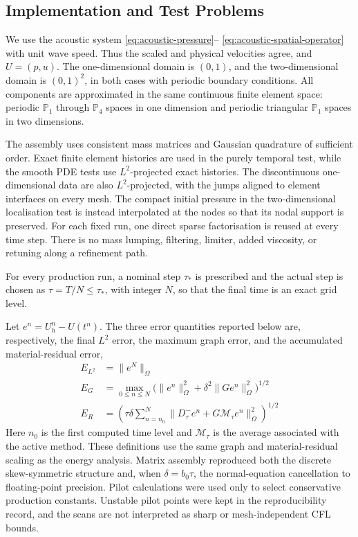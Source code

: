 \documentclass[11pt]{article}
\begin{document}

\subsection{Implementation and Test Problems}
\label{subsec:numerical-implementation}
We use the acoustic system \eqref{eq:acoustic-pressure}--
\eqref{eq:acoustic-spatial-operator} with unit wave speed. Thus the scaled
and physical velocities agree, and \(U=(p,u)\). The one-dimensional domain is
\((0,1)\), and the two-dimensional domain is \((0,1)^2\), in both cases with
periodic boundary conditions. All components are approximated in the same
continuous finite element space: periodic \(\mathbb P_1\) through \(\mathbb P_4\) spaces in one
dimension and periodic triangular \(\mathbb P_1\) spaces in two dimensions.

The assembly uses consistent mass matrices and Gaussian quadrature of
sufficient order. Exact finite element histories are used in the purely
temporal test, while the smooth PDE tests use \(L^2\)-projected exact
histories. The discontinuous one-dimensional data are also \(L^2\)-projected,
with the jumps aligned to element interfaces on every mesh. The compact
initial pressure in the two-dimensional localisation test is instead
interpolated at the nodes so that its nodal support is preserved. For each fixed run, one
direct sparse factorisation is reused at every time step. There is no mass
lumping, filtering, limiter, added viscosity, or retuning along a refinement
path.

For every production run, a nominal step \(\tau_*\) is prescribed and the
actual step is chosen as \(\tau=T/N\leq\tau_*\), with integer \(N\), so that
the final time is an exact grid level.

Let \(e^n=U_h^n-U(t^n)\). The three error quantities reported below are,
respectively, the final \(L^2\) error, the maximum graph error, and the
accumulated material-residual error,
\begin{align}
E_{L^2}&=\|e^N\|_{\Omega} \label{eq:numerical-final-l2-error}\\
E_{G}&=\max_{0\le n\le N}
\bigl(\|e^n\|_{\Omega}^2+\delta^2\|Ge^n\|_{\Omega}^2\bigr)^{1/2}
\label{eq:numerical-maximum-graph-error}\\
E_{R}&=\left(\tau\delta\sum_{n=n_0}^{N}
\|D_{\tau}^{-}e^n+G\mathcal M_{\tau}e^n\|_{\Omega}^2\right)^{1/2}
\label{eq:numerical-material-residual-error}
\end{align}
Here \(n_0\) is the first computed time level and \(\mathcal M_{\tau}\) is the
average associated with the active method. These definitions use the same
graph and material-residual scaling as the energy analysis. Matrix assembly
reproduced both the discrete skew-symmetric structure and, when
\(\delta=b_0\tau\), the normal-equation cancellation to
floating-point precision. Pilot calculations were used only to select
conservative production constants. Unstable pilot points were kept in
the reproducibility record, and the scans are not interpreted as sharp or
mesh-independent CFL bounds.
\end{document}
